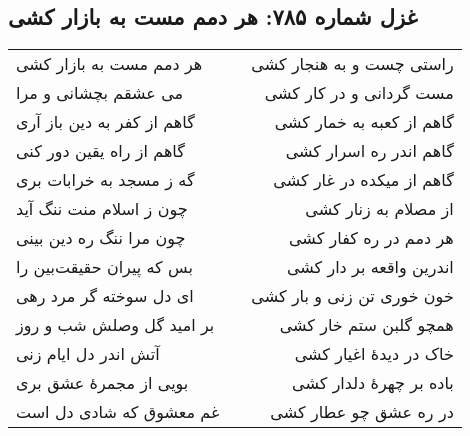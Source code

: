 \begin{center}
\section*{غزل شماره ۷۸۵: هر دمم مست به بازار کشی}
\label{sec:785}
\begin{longtable}{l p{0.5cm} r}
هر دمم مست به بازار کشی
&&
راستی چست و به هنجار کشی
\\
می عشقم بچشانی و مرا
&&
مست گردانی و در کار کشی
\\
گاهم از کفر به دین باز آری
&&
گاهم از کعبه به خمار کشی
\\
گاهم از راه یقین دور کنی
&&
گاهم اندر ره اسرار کشی
\\
گه ز مسجد به خرابات بری
&&
گاهم از میکده در غار کشی
\\
چون ز اسلام منت ننگ آید
&&
از مصلام به زنار کشی
\\
چون مرا ننگ ره دین بینی
&&
هر دمم در ره کفار کشی
\\
بس که پیران حقیقت‌بین را
&&
اندرین واقعه بر دار کشی
\\
ای دل سوخته گر مرد رهی
&&
خون خوری تن زنی و بار کشی
\\
بر امید گل وصلش شب و روز
&&
همچو گلبن ستم خار کشی
\\
آتش اندر دل ایام زنی
&&
خاک در دیدهٔ اغیار کشی
\\
بویی از مجمرهٔ عشق بری
&&
باده بر چهرهٔ دلدار کشی
\\
غم معشوق که شادی دل است
&&
در ره عشق چو عطار کشی
\\
\end{longtable}
\end{center}
